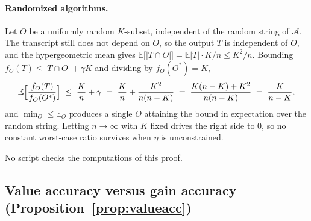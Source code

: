 \paragraph{Randomized algorithms.}
Let $O$ be a uniformly random $K$-subset, independent of the random string of
$\mathcal A$.  The transcript still does not depend on $O$, so the output $T$
is independent of $O$, and the hypergeometric mean gives
$\mathbb E\bigl[|T\cap O|\bigr]=\mathbb E|T|\cdot K/n\le K^{2}/n$.  Bounding
$f_O(T)\le|T\cap O|+\gamma K$ and dividing by $f_O(O^{\ast})=K$,
\[
  \mathbb E\Bigl[\frac{f_O(T)}{f_O(O^{\ast})}\Bigr]
  \;\le\;\frac{K}{n}+\gamma
  \;=\;\frac{K}{n}+\frac{K^{2}}{n(n-K)}
  \;=\;\frac{K(n-K)+K^{2}}{n(n-K)}
  \;=\;\frac{K}{n-K} ,
\]
and $\min_{O}\le\mathbb E_{O}$ produces a single $O$ attaining the bound in
expectation over the random string.  Letting $n\to\infty$ with $K$ fixed drives
the right side to $0$, so no constant worst-case ratio survives when $\eta$ is
unconstrained.

No script checks the computations of this proof.

\subsection{Value accuracy versus gain accuracy
(Proposition~\ref{prop:valueacc})}\label{app:valueacc}

